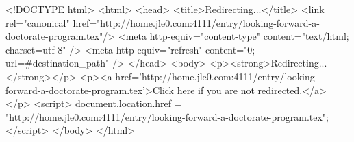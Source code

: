 <!DOCTYPE html>
<html>
<head>
<title>Redirecting...</title>
<link rel="canonical" href="http://home.jle0.com:4111/entry/looking-forward-a-doctorate-program.tex"/>
<meta http-equiv="content-type" content="text/html; charset=utf-8" />
<meta http-equiv="refresh" content="0; url=#{destination_path}" />
</head>
<body>
  <p><strong>Redirecting...</strong></p>
  <p><a href='http://home.jle0.com:4111/entry/looking-forward-a-doctorate-program.tex'>Click here if you are not redirected.</a></p>
  <script>
    document.location.href = "http://home.jle0.com:4111/entry/looking-forward-a-doctorate-program.tex";
  </script>
</body>
</html>
